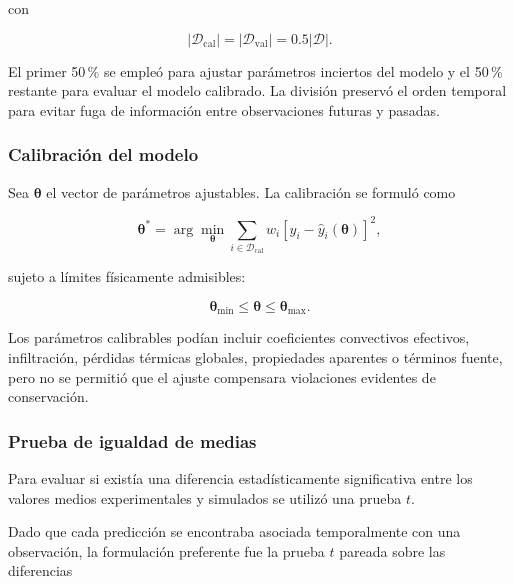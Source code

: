 con

\begin{equation}
|\mathcal{D}_{\mathrm{cal}}|
=
|\mathcal{D}_{\mathrm{val}}|
=
0.5|\mathcal{D}|.
\end{equation}

El primer 50\,\% se empleó para ajustar parámetros inciertos del modelo y el 50\,\% restante para evaluar el modelo calibrado. La división preservó el orden temporal para evitar fuga de información entre observaciones futuras y pasadas.

\subsubsection{Calibración del modelo}
\label{subsubsec:calibracion_modelo}

Sea $\boldsymbol{\theta}$ el vector de parámetros ajustables. La calibración se formuló como

\begin{equation}
\boldsymbol{\theta}^{*}
=
\arg\min_{\boldsymbol{\theta}}
\sum_{i\in\mathcal{D}_{\mathrm{cal}}}
w_i
\left[
y_i-
\hat y_i(\boldsymbol{\theta})
\right]^2,
\label{eq:calibracion_parametros}
\end{equation}

sujeto a límites físicamente admisibles:

\begin{equation}
\boldsymbol{\theta}_{\min}
\leq
\boldsymbol{\theta}
\leq
\boldsymbol{\theta}_{\max}.
\end{equation}

Los parámetros calibrables podían incluir coeficientes convectivos efectivos, infiltración, pérdidas térmicas globales, propiedades aparentes o términos fuente, pero no se permitió que el ajuste compensara violaciones evidentes de conservación.

\subsubsection{Prueba de igualdad de medias}
\label{subsubsec:t_test}

Para evaluar si existía una diferencia estadísticamente significativa entre los valores medios experimentales y simulados se utilizó una prueba $t$.

Dado que cada predicción se encontraba asociada temporalmente con una observación, la formulación preferente fue la prueba $t$ pareada sobre las diferencias

